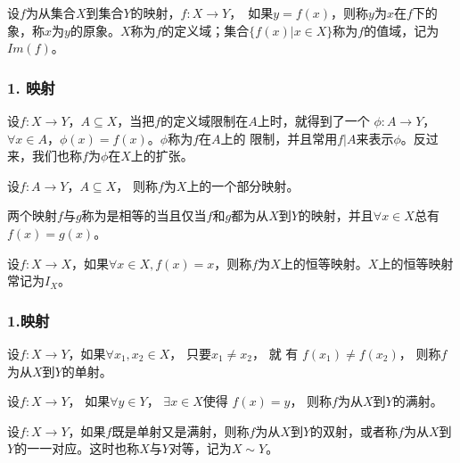 \documentclass{beamer}
\begin{document}
\begin{CJK*}{UTF8}{gbsn}
\begin{frame}
  \begin{Def}\justifying\let\raggedright\justifying
    设$f$为从集合$X$到集合$Y$的映射，$f:X\to Y$，　如果$y = f(x)$，则称$y$为$x$在$f$下的\alert{象}，称$x$为$y$的\alert{原象}。$X$称为$f$的\alert{定义域}；集合$\{f(x) | x \in X\}$称为$f$的\alert{值域}，记为$Im(f)$。
  \end{Def}
\end{frame}
\begin{frame}
  \frametitle{1. 映射}

  \begin{Def}
    设$f:X\to Y$，$A\subseteq X$，当把$f$的定义域限制在$A$上时，就得到了一个
    $\phi: A\to Y$，$\forall x \in A$，$\phi(x) = f(x)$。$\phi$称为$f$在$A$上的
    \alert{限制}，并且常用$f|A$来表示$\phi$。反过来，我们也称$f$为$\phi$在$X$上的\alert{扩张}。
  \end{Def}\pause
    \begin{Def}
    设$f:A \to Y$，$A \subseteq X$， 则称$f$为$X$上的一个\alert{部分映射}。
  \end{Def}\pause
  \begin{Def}
    两个映射$f$与$g$称为是\alert{相等}的当且仅当$f$和$g$都为从$X$到$Y$的映射，并且$\forall x \in X$总有$f(x) = g(x)$。
  \end{Def}\pause
  \begin{Def}
    设$f:X\to X$，如果$\forall x \in X, f(x) = x$，则称$f$为$X$上的恒等映射。$X$上的恒等映射常记为$I_X$。
  \end{Def}

\end{frame}

\begin{frame}
  \frametitle{1.映射}
  \begin{Def}\justifying\let\raggedright\justifying
    设$f:X\to Y$，如果$\forall x_1, x_2 \in X$， 只要$x_1 \neq x_2$，  就 有 $f(x_1) \neq f(x_2)$，   则称$f$为从$X$到$Y$的\alert{单射}。
  \end{Def}
  \begin{Def}\justifying\let\raggedright\justifying
    设$f:X\to Y$， 如果$\forall y \in Y$， $\exists x \in X$使得 $f(x) = y$， 则称$f$为从$X$到$Y$的\alert{满射}。
  \end{Def}
  \begin{Def}\justifying\let\raggedright\justifying
    设$f:X\to Y$，如果$f$既是单射又是满射，则称$f$为从$X$到$Y$的\alert{双射}，或者称$f$为从$X$到$Y$的\alert{一一对应}。这时也称$X$与$Y$\alert{对等}，记为$X\sim Y$。
  \end{Def}


\end{frame}
\end{CJK*}
\end{document}
